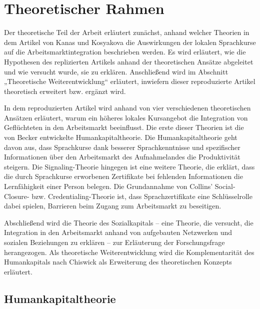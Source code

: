 \chapter{Theoretischer Rahmen}
\label{cha:theorie}

Der theoretische Teil der Arbeit erläutert zunächst, anhand welcher Theorien in dem Artikel von Kanas und Kosyakova die Auswirkungen der lokalen Sprachkurse auf die Arbeitsmarktintegration beschrieben werden. Es wird erläutert, wie die Hypothesen des replizierten Artikels anhand der theoretischen Ansätze abgeleitet und wie versucht wurde, sie zu erklären. Anschließend wird im Abschnitt „Theoretische Weiterentwicklung“ erläutert, inwiefern dieser reproduzierte Artikel theoretisch erweitert bzw. ergänzt wird.

In dem reproduzierten Artikel wird anhand von vier verschiedenen theoretischen Ansätzen erläutert, warum ein höheres lokales Kursangebot die Integration von Geflüchteten in den Arbeitsmarkt beeinflusst. Die erste dieser Theorien ist die von Becker entwickelte Humankapitaltheorie. Die Humankapitaltheorie geht davon aus, dass Sprachkurse dank besserer Sprachkenntnisse und spezifischer Informationen über den Arbeitsmarkt des Aufnahmelandes die Produktivität steigern. Die Signaling-Theorie hingegen ist eine weitere Theorie, die erklärt, dass die durch Sprachkurse erworbenen Zertifikate bei fehlenden Informationen die Lernfähigkeit einer Person belegen. Die Grundannahme von Collins’ Social-Closure- bzw. Credentialing-Theorie ist, dass Sprachzertifikate eine Schlüsselrolle dabei spielen, Barrieren beim Zugang zum Arbeitsmarkt zu beseitigen. 

Abschließend wird die Theorie des Sozialkapitals – eine Theorie, die versucht, die Integration in den Arbeitsmarkt anhand von aufgebauten Netzwerken und sozialen Beziehungen zu erklären – zur Erläuterung der Forschungsfrage herangezogen. Als theoretische Weiterentwicklung wird die Komplementarität des Humankapitals nach Chiswick als Erweiterung des theoretischen Konzepts erläutert.

\section{Humankapitaltheorie}
\label{cha:human}

